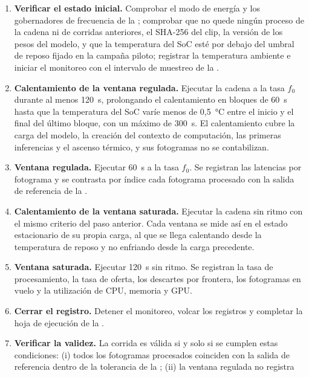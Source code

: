 \begin{enumerate}
  \item \textbf{Verificar el estado inicial.} Comprobar el modo de energía
        y los gobernadores de frecuencia de la ; comprobar que
        no quede ningún proceso de la cadena ni de corridas anteriores, el
        SHA-256 del clip, la versión de los pesos del modelo, y que la
        temperatura del SoC esté por debajo del umbral de reposo fijado en
        la campaña piloto; registrar la temperatura ambiente e iniciar el
        monitoreo con el intervalo de muestreo de la
        .
  \item \textbf{Calentamiento de la ventana regulada.} Ejecutar la cadena a
        la tasa $f_0$ durante al menos 120~s, prolongando el calentamiento
        en bloques de 60~s hasta que la temperatura del SoC varíe menos de
        0,5~°C entre el inicio y el final del último bloque, con un máximo
        de 300~s. El calentamiento cubre la carga del modelo, la creación
        del contexto de computación, las primeras inferencias y el ascenso
        térmico, y sus fotogramas no se contabilizan.
  \item \textbf{Ventana regulada.} Ejecutar 60~s a la tasa $f_0$. Se
        registran las latencias por fotograma y se contrasta por índice
        cada fotograma procesado con la salida de referencia de la
        .
  \item \textbf{Calentamiento de la ventana saturada.} Ejecutar la cadena
        sin ritmo con el mismo criterio del paso anterior. Cada ventana se
        mide así en el estado estacionario de su propia carga, al que se
        llega calentando desde la temperatura de reposo y no enfriando
        desde la carga precedente.
  \item \textbf{Ventana saturada.} Ejecutar 120~s sin ritmo. Se registran la
        tasa de procesamiento, la tasa de oferta, los descartes por frontera,
        los fotogramas en vuelo y la utilización de CPU, memoria y GPU.
  \item \textbf{Cerrar el registro.} Detener el monitoreo, volcar los
        registros y completar la hoja de ejecución de la
        .
  \item \textbf{Verificar la validez.} La corrida es válida si y solo si se
        cumplen estas condiciones: (i) todos los fotogramas procesados
        coinciden con la salida de referencia dentro de la tolerancia de la
        ; (ii) la ventana regulada no registra

\end{enumerate}
